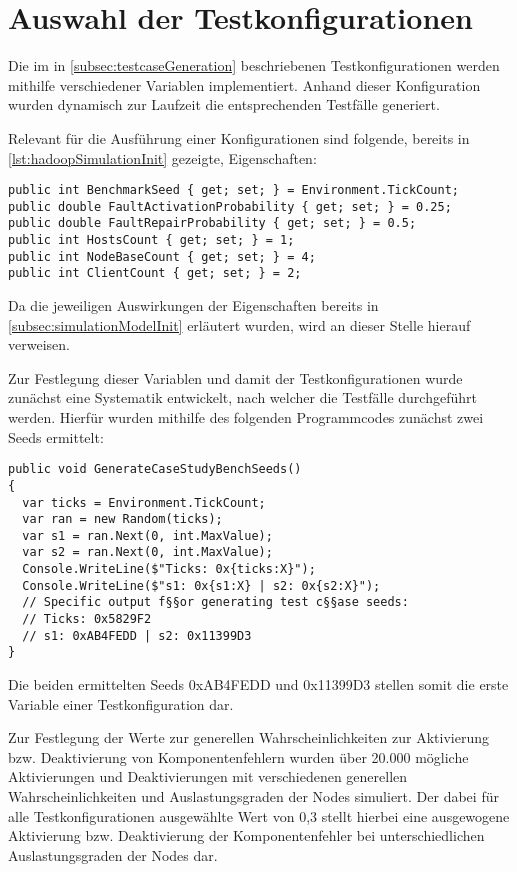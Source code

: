 \section{Auswahl der Testkonfigurationen}
\label{sec:selectTestcases}

Die im in \cref{subsec:testcaseGeneration} beschriebenen Testkonfigurationen werden mithilfe verschiedener Variablen implementiert.
Anhand dieser Konfiguration wurden dynamisch zur Laufzeit die entsprechenden Testfälle generiert.

Relevant für die Ausführung einer Konfigurationen sind folgende, bereits in \cref{lst:hadoopSimulationInit} gezeigte, Eigenschaften:

\begin{lstlisting}[label=lst:hadoopTest,style=cs,
caption={Zur Definition einer Testkonfiguration relevante Felder}]
public int BenchmarkSeed { get; set; } = Environment.TickCount;
public double FaultActivationProbability { get; set; } = 0.25;
public double FaultRepairProbability { get; set; } = 0.5;
public int HostsCount { get; set; } = 1;
public int NodeBaseCount { get; set; } = 4;
public int ClientCount { get; set; } = 2;
\end{lstlisting}

Da die jeweiligen Auswirkungen der Eigenschaften bereits in \cref{subsec:simulationModelInit} erläutert wurden, wird an dieser Stelle hierauf verweisen.

Zur Festlegung dieser Variablen und damit der Testkonfigurationen wurde zunächst eine Systematik entwickelt, nach welcher die Testfälle durchgeführt werden.
Hierfür wurden mithilfe des folgenden Programmcodes zunächst zwei Seeds ermittelt:

\begin{lstlisting}[label=lst:generateTestCaseSeeds,style=cs,
caption={Ermittlung der für die Testkonfigurationen genutzten Basisseeds}]
public void GenerateCaseStudyBenchSeeds()
{
  var ticks = Environment.TickCount;
  var ran = new Random(ticks);
  var s1 = ran.Next(0, int.MaxValue);
  var s2 = ran.Next(0, int.MaxValue);
  Console.WriteLine($"Ticks: 0x{ticks:X}");
  Console.WriteLine($"s1: 0x{s1:X} | s2: 0x{s2:X}");
  // Specific output f§§or generating test c§§ase seeds:
  // Ticks: 0x5829F2
  // s1: 0xAB4FEDD | s2: 0x11399D3
}
\end{lstlisting}

Die beiden ermittelten Seeds 0xAB4FEDD und 0x11399D3 stellen somit die erste Variable einer Testkonfiguration dar.

Zur Festlegung der Werte zur generellen Wahrscheinlichkeiten zur Aktivierung bzw. Deaktivierung von Komponentenfehlern wurden über 20.000 mögliche Aktivierungen und Deaktivierungen mit verschiedenen generellen Wahrscheinlichkeiten und Auslastungsgraden der Nodes simuliert.
Der dabei für alle Testkonfigurationen ausgewählte Wert von 0,3 stellt hierbei eine ausgewogene Aktivierung bzw. Deaktivierung der Komponentenfehler bei unterschiedlichen Auslastungsgraden der Nodes dar.

